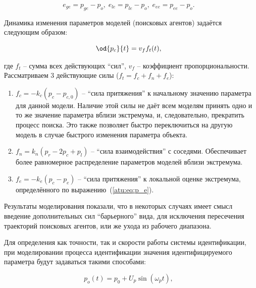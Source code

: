 \documentclass[a4paper,paratype,12pt,fouriernc]{cmonogra}
\begin{document}
\begin{equation}
  e_{ge} = p_{ge} - p_o, \;
  e_{le} = p_{le} - p_o, \;
  e_{ee} = p_{ee} - p_o.
  \label{atu:eq:e_xx}
\end{equation}


Динамика изменения параметров моделей (поисковых агентов) задаётся следующим образом:

\begin{equation}
  \od{p_c}{t} = v_f f_t(t),
  \label{atu:eq:dp_dt}
\end{equation}

\noindent
где $f_t$ -- сумма всех действующих ``сил'', $v_f$ -- коэффициент
пропорциональности. Рассматриваем 3 действующие силы
($ f_t = f_c + f_n + f_e $):

\begin{enumerate}
  \item
    $f_c = -k_c (p_c - p_{c,0}) $ -- ``сила притяжения'' к начальному значению
    параметра
    для данной модели. Наличие этой силы не даёт всем моделям принять одно
    и то же значение параметра вблизи экстремума, и, следовательно,
    прекратить процесс поиска. Это также позволяет быстро переключиться
    на другую модель в случае быстрого изменения параметра объекта.

  \item
    $f_n = k_n ( p_r - 2 p_c + p_l ) $ -- ``сила взаимодействия''
    с соседями. Обеспечивает более равномерное распределение
    параметров моделей вблизи экстремума.

  \item
    $f_e = - k_e ( p_c - p_e ) $ -- ``сила притяжения'' к локальной
    оценке экстремума, определённого по выражению~(\ref{atu:eq:p_e}).

\end{enumerate}

Результаты моделирования показали, что в некоторых случаях
имеет смысл введение дополнительных сил ``барьерного'' вида,
для исключения пересечения траекторий поисковых агентов, или же ухода из рабочего диапазона.



Для определения как точности, так и скорости работы системы
идентификации, при моделировании процесса идентификации
значения идентифицируемого параметра будут задаваться такими способами:

\begin{equation}
  p_o(t) = p_0 +  U_{p} \sin( \omega_{p} t ),
  \label{atu:eq:p_sin}
\end{equation}
\end{document}
